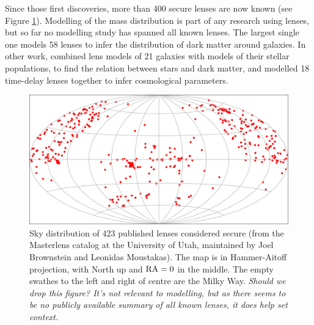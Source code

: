 Since those first discoveries, more than 400 secure lenses are now
known (see Figure \ref{fig:masterlens}).  Modelling of the mass
distribution is part of any research using lenses, but so far no
modelling study has spanned all known lenses.  The largest single one
\citep{2009ApJ...703L..51K} models 58 lenses to infer the distribution
of dark matter around galaxies.  In other work,
\cite{2011ApJ...740...97L} combined lens models of 21 galaxies with
models of their stellar populations, to find the relation between
stars and dark matter, and \cite{2014MNRAS.437..600S} modelled 18
time-delay lenses together to infer cosmological parameters.

\begin{figure}
\centering
\includegraphics[width=\hsize]{fig/lenssky}
\caption{Sky distribution of 423 published lenses considered secure
  (from the Masterlens catalog at the University of Utah, maintained
  by Joel Brownstein and Leonidas Moustakas).  The map is in
  Hammer-Aitoff projection, with North up and $\rm RA=0$ in the
  middle. The empty swathes to the left and right of centre are the
  Milky Way. {\em Should we drop this figure?  It's not relevant to
    modelling, but as there seems to be no publicly available summary
    of all known lenses, it does help set context.}}
\label{fig:masterlens}
\end{figure}

